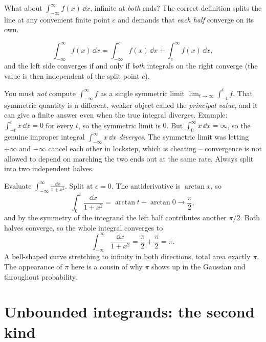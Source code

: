 What about $\int_{-\infty}^{\infty} f(x)\,\dd x$, infinite at \emph{both} ends? The
correct definition splits the line at any convenient finite point $c$ and demands
that \emph{each half} converge on its own.

\begin{definition}
\label{ch25:def-doubly}
\[
  \int_{-\infty}^{\infty} f(x)\,\dd x
  = \int_{-\infty}^{c} f(x)\,\dd x + \int_{c}^{\infty} f(x)\,\dd x,
\]
and the left side converges if and only if \emph{both} integrals on the right
converge (the value is then independent of the split point $c$).
\end{definition}

\begin{trapbox}
You must \emph{not} compute $\int_{-\infty}^{\infty} f$ as a single symmetric limit
$\lim_{t\to\infty}\int_{-t}^{t} f$. That symmetric quantity is a different,
weaker object called the \emph{principal value}, and it can give a finite answer
even when the true integral diverges. Example: $\int_{-t}^{t} x\,\dd x = 0$ for
every $t$, so the symmetric limit is $0$. But $\int_0^\infty x\,\dd x = \infty$,
so the genuine improper integral $\int_{-\infty}^{\infty} x\,\dd x$ \emph{diverges}.
The symmetric limit was letting $+\infty$ and $-\infty$ cancel each other in
lockstep, which is cheating -- convergence is not allowed to depend on marching the
two ends out at the same rate. Always split into two independent halves.
\end{trapbox}

\begin{example}
\label{ch25:ex-arctan}
Evaluate $\displaystyle\int_{-\infty}^{\infty}\frac{\dd x}{1+x^2}$. Split at
$c=0$. The antiderivative is $\arctan x$, so
\[
  \int_0^{t}\frac{\dd x}{1+x^2} = \arctan t - \arctan 0 \to \frac{\pi}{2},
\]
and by the symmetry of the integrand the left half contributes another $\pi/2$.
Both halves converge, so the whole integral converges to
\[
  \int_{-\infty}^{\infty}\frac{\dd x}{1+x^2} = \frac{\pi}{2} + \frac{\pi}{2} = \pi.
\]
A bell-shaped curve stretching to infinity in both directions, total area exactly
$\pi$. The appearance of $\pi$ here is a cousin of why $\pi$ shows up in the
Gaussian and throughout probability.
\end{example}

\section{Unbounded integrands: the second kind}
\label{ch25:second-kind}

